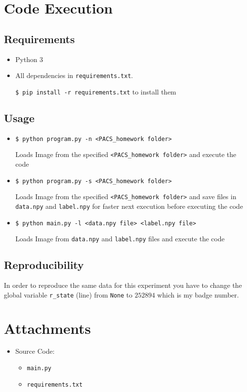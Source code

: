 \documentclass[a4paper, 11pt]{article}
\begin{document}
	\section{Code Execution}
	\subsection{Requirements}
	\begin{itemize}
		\item Python 3
		\item All dependencies in \texttt{requirements.txt}.
		
		\texttt{\$ pip install -r requirements.txt} to install them
	\end{itemize}
	\subsection{Usage}
	\begin{itemize}
		\item \texttt{\$ python program.py -n <PACS\_homework folder>}
		
		Loads Image from the specified \texttt{<PACS\_homework folder>} and execute the code
		
		\item \texttt{\$ python program.py -s <PACS\_homework folder>}
		
		Loads Image from the specified \texttt{<PACS\_homework folder>} and save files in \texttt{data.npy} and \texttt{label.npy} for faster next execution before executing the code
		
		\item \texttt{\$ python main.py -l <data.npy file> <label.npy file> }
		
		Loads Image from \texttt{data.npy} and \texttt{label.npy} files and execute the code
	
	\end{itemize}
	\subsection{Reproducibility}
	In order to reproduce the same data for this experiment you have to change the global variable \texttt{r\_state} (line) from \texttt{None} to $252894$ which is my badge number.

	\section*{Attachments}
	\begin{itemize}
		\item Source Code:
		\begin{itemize}
			\item \texttt{main.py}
			\item \texttt{requirements.txt}
		\end{itemize}
	\end{itemize}
	
\end{document}
